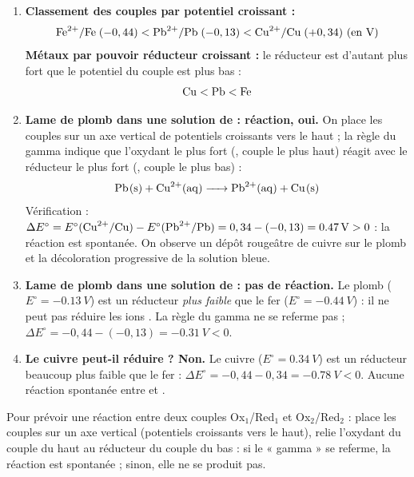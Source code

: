 \documentclass[11pt]{article}
\begin{document}
\begin{corrige}
\begin{enumerate}
\item \textbf{Classement des couples par potentiel croissant :}
\[ \ce{Fe^2+}/\ce{Fe}\;(-0,44) < \ce{Pb^2+}/\ce{Pb}\;(-0,13) < \ce{Cu^2+}/\ce{Cu}\;(+0,34)\ \text{(en V)} \]
\textbf{Métaux par pouvoir réducteur croissant :} le réducteur est d'autant plus fort que le potentiel du couple est plus bas :
\[ \ce{Cu} < \ce{Pb} < \ce{Fe} \]
\item \textbf{Lame de plomb dans une solution de  : réaction, oui.} On place les couples sur un axe vertical de potentiels croissants vers le haut ; la règle du gamma indique que l'oxydant le plus fort (, couple le plus haut) réagit avec le réducteur le plus fort (, couple le plus bas) :
\[ \ce{Pb(s) + Cu^2+(aq) -> Pb^2+(aq) + Cu(s)} \]
Vérification : $\Delta E^{\circ} = E^{\circ}(\ce{Cu^2+}/\ce{Cu}) - E^{\circ}(\ce{Pb^2+}/\ce{Pb}) = 0,34 - (-0,13) = \SI{+0,47}{V} > 0$ : la réaction est spontanée. On observe un dépôt rougeâtre de cuivre sur le plomb et la décoloration progressive de la solution bleue.
\item \textbf{Lame de plomb dans une solution de  : pas de réaction.} Le plomb ($E^{\circ} = \SI{-0,13}{V}$) est un réducteur \emph{plus faible} que le fer ($E^{\circ} = \SI{-0,44}{V}$) : il ne peut pas réduire les ions . La règle du gamma ne se referme pas ; $\Delta E^{\circ} = -0,44 - (-0,13) = \SI{-0,31}{V} < 0$.
\item \textbf{Le cuivre peut-il réduire  ? Non.} Le cuivre ($E^{\circ} = \SI{+0,34}{V}$) est un réducteur beaucoup plus faible que le fer : $\Delta E^{\circ} = -0,44 - 0,34 = \SI{-0,78}{V} < 0$. Aucune réaction spontanée entre  et .
\end{enumerate}
\begin{methode}
Pour prévoir une réaction entre deux couples Ox$_1$/Red$_1$ et Ox$_2$/Red$_2$ : place les couples sur un axe vertical (potentiels croissants vers le haut), relie l'oxydant du couple du haut au réducteur du couple du bas : si le « gamma » se referme, la réaction est spontanée ; sinon, elle ne se produit pas.
\end{methode}
\end{corrige}
\end{document}

